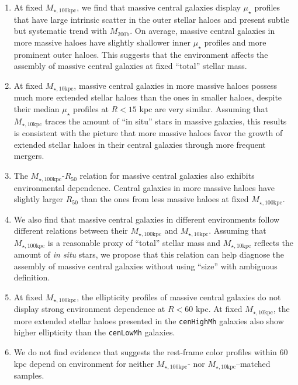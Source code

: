 \documentclass[a4paper,fleqn,usenatbib]{mnras}
\def\rbcg{\texttt{cenHighMh}}
\def\nbcg{\texttt{cenLowMh}}
\def\mhalo{{$M_{\mathrm{200b}}$}}
\def\minn{{$M_{\star,10\mathrm{kpc}}$}}
\def\mtot{{$M_{\star,100\mathrm{kpc}}$}}
\def\mden{{$\mu_{\star}$}}
\begin{document}
    \begin{enumerate}
    
        \item At fixed \mtot{}, we find that massive central galaxies display \mden{} 
            profiles that have large intrinsic scatter in the outer stellar haloes and 
            present subtle but systematic trend with \mhalo{}.
            On average, massive central galaxies in more massive haloes have slightly 
            shallower inner \mden{} profiles and more prominent outer haloes. 
            This suggests that the environment affects the assembly of massive central
            galaxies at fixed ``total'' stellar mass.
            
        \item At fixed \minn{}, massive central galaxies in more massive haloes 
            possess much more extended stellar haloes than the ones in smaller haloes, 
            despite their median \mden{} profiles at $R < 15$ kpc are very similar. 
            Assuming that \minn{} traces the amount of ``in situ'' stars in massive
            galaxies, this results is consistent with the picture that more massive 
            haloes favor the growth of extended stellar haloes in their central 
            galaxies through more frequent mergers. 
        
        \item The \mtot{}-$R_{\mathrm{50}}$ relation for massive central galaxies 
            also exhibits environmental dependence. 
            Central galaxies in more massive haloes have slightly larger
            $R_{\mathrm{50}}$ than the ones from less massive haloes at fixed \mtot{}. 
        
        \item We also find that massive central galaxies in different environments
            follow different relations between their \mtot{} and \minn{}. 
            Assuming that \mtot{} is a reasonable proxy of ``total'' stellar mass and 
            \minn{} reflects the amount of \textit{in situ} stars, we propose that 
            this relation can help diagnose the assembly of massive central galaxies 
            without using ``size'' with ambiguous definition. 
        
        \item At fixed \mtot{}, the ellipticity profiles of massive central galaxies 
            do not display strong environment dependence at $R < 60$ kpc. 
            At fixed \minn{}, the more extended stellar haloes presented in the \rbcg{}
            galaxies also show higher ellipticity than the \nbcg{} galaxies. 
        
        \item We do not find evidence that suggests the rest-frame color profiles 
            within 60 kpc depend on environment for neither \mtot{}- nor 
            \minn{}--matched samples. 
             
    \end{enumerate}
    
\end{document}
